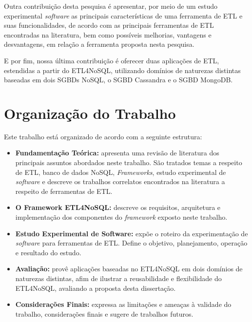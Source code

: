 Outra contribuição desta pesquisa é apresentar, por meio de um estudo experimental \textit{software} as principais características de uma ferramenta de ETL e suas funcionalidades, de acordo com as principais ferramentas de ETL encontradas na literatura, bem como possíveis melhorias, vantagens e desvantagens, em relação a ferramenta proposta nesta pesquisa.

E por fim, nossa última contribuição é oferecer duas aplicações de ETL, estendidas a partir do ETL4NoSQL, utilizando domínios de naturezas distintas baseadas em dois SGBDs NoSQL, o SGBD Cassandra e o SGBD MongoDB. 


\section{Organização do Trabalho}

Este trabalho está organizado de acordo com a seguinte estrutura:

\begin{itemize}
	\item \textbf{Fundamentação Teórica:} apresenta uma revisão de literatura dos principais assuntos abordados neste trabalho. São tratados temas a respeito de ETL, banco de dados NoSQL, \textit{Frameworks}, estudo experimental de \textit{software} e descreve os trabalhos correlatos encontrados na literatura a respeito de ferramentas de ETL.
	
	\item \textbf{O Framework ETL4NoSQL:} descreve os requisitos, arquitetura e implementação dos componentes do \textit{framework} exposto neste trabalho.
			
	\item \textbf{Estudo Experimental de Software:} expõe o roteiro da experimentação de \textit{software} para ferramentas de ETL. Define o objetivo, planejamento, operação e resultado do estudo.
	
	\item \textbf{Avaliação:} provê aplicações baseadas no ETL4NoSQL em dois domínios de naturezas distintas, afim de ilustrar a reusabilidade e flexibilidade do ETL4NoSQL, avaliando a proposta desta dissertação.
		
	\item \textbf{Considerações Finais:} expressa as limitações e ameaças à validade do trabalho, considerações finais e sugere de trabalhos futuros.	
	
\end{itemize}

